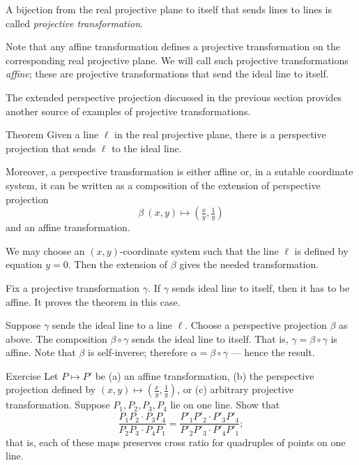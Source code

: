 A bijection from the real projective plane to itself 
that sends lines to lines 
is called \emph{projective transformation}.

Note that any affine transformation defines  a projective transformation on the corresponding real projective plane.
We will call such projective transformations \emph{affine}; 
these are projective transformations that send the ideal line to itself.

The extended perspective projection discussed in the previous section 
provides another source of examples of projective transformations.

\begin{thm}{Theorem}\label{thm:moving}
Given a line $\ell$ in the real projective plane, there is a perspective projection that sends $\ell$ to the ideal line.

Moreover, a perspective transformation is either affine or, in a sutable coordinate system, it can be written as a composition of the extension of perspective projection 
\[\beta\:(x,y)\mapsto (\tfrac xy,\tfrac 1y)\]
and an affine transformation.
\end{thm}

We may choose an $(x,y)$-coordinate system such that the line $\ell$ is defined by equation $y=0$.
Then the extension of $\beta$ gives the needed transformation.

Fix a projective transformation $\gamma$.
If $\gamma$ sends ideal line to itself,
then it has to be affine. 
It proves the theorem in this case.

Suppose $\gamma$ sends the ideal line to a line $\ell$.
Choose a perspective projection $\beta$ as above.
The composition $\beta\circ\gamma$ sends the ideal line to itself.
That is, $\gamma=\beta\circ\gamma$ is affine.
Note that $\beta$ is self-inverse; therefore $\alpha=\beta\circ \gamma$ --- hence the result.
\qeds

\begin{thm}{Exercise}\label{ex:proj-cross-ratio}
Let $P\mapsto P'$ be (a) an affine transformation, (b) the perspective projection defined by $(x,y)\mapsto (\tfrac xy,\tfrac 1y)$, or (c) arbitrary projective transformation.
Suppose $P_1,P_2,P_3,P_4$ lie on one line.
Show that 
\[\frac{P_1P_2\cdot P_3P_4}{P_2P_3\cdot P_4P_1}=\frac{P'_1P'_2\cdot P'_3P'_4}{P'_2P'_3\cdot P'_4P'_1};\]
that is, each of these maps preserves cross ratio for quadruples of points on one line.

\end{thm}

